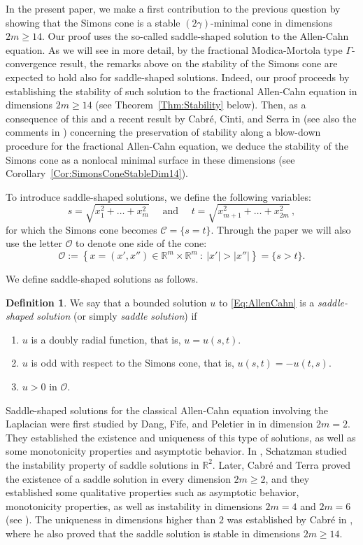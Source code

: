 \documentclass[12pt,reqno]{amsart}
\theoremstyle{definition}
\newtheorem{definition}[theorem]{Definition}
\theoremstyle{remark}
\newcommand{\con}[1]{\mathbb{#1}}
\newcommand{\R}{\con{R}} %
\newcommand{\ocal}{\mathcal{O}}
\newcommand{\s}{\gamma}
\newcommand{\setcond}[2]{\left \{ #1 \ : \ #2  \right \}}
\numberwithin{equation}{section}
\begin{document}
In the present paper, we make a first contribution to the previous question by showing that the Simons cone is a stable $(2\s)$-minimal cone in dimensions $2m\geq 14$. Our proof uses the so-called saddle-shaped solution to the Allen-Cahn equation. As we will see in more detail, by the fractional Modica-Mortola type $\Gamma$-convergence result, the remarks above on the stability of the Simons cone are expected to hold also for saddle-shaped solutions. Indeed, our proof proceeds by establishing the stability of such solution to the fractional Allen-Cahn equation in dimensions $2m \geq 14$ (see Theorem~\ref{Thm:Stability} below). Then, as a consequence of this and a recent result by Cabré, Cinti, and Serra in \cite{CabreCintiSerra-Stable} (see also the comments in \cite{CabreCintiSerra-Cones}) concerning the preservation of stability along a blow-down procedure for the fractional Allen-Cahn equation, we deduce the stability of the Simons cone as a nonlocal minimal surface in these dimensions (see Corollary~\ref{Cor:SimonsConeStableDim14}). 

To introduce saddle-shaped solutions, we define the following variables:
$$
s = \sqrt{x_1^2 + \ldots + x_m^2 } \quad \text{ and } \quad 
t = \sqrt{x_{m+1}^2 + \ldots + x_{2m}^2}\,,
$$
for which the Simons cone becomes $\mathscr{C} = \{s=t\}$.
Through the paper we will also use the letter $\ocal$ to denote one side of the cone:
$$
\ocal:= \setcond{x = (x', x'') \in \R^{m}\times \R^m}{|x'| > |x''|} = \{s > t\}.
$$

We define saddle-shaped solutions as follows.

\begin{definition}
\label{Def:SaddleShapedSol}
We say that a bounded solution $u$ to \eqref{Eq:AllenCahn} is a \emph{saddle-shaped solution} (or simply \emph{saddle solution}) if
\begin{enumerate}[label=(\roman{*})]
\item $u$ is a doubly radial function, that is, $u = u(s,t)$.
\item $u$ is odd with respect to the Simons cone, that is, $u(s,t)=-u(t,s)$.
\item $u > 0$ in $\ocal$.
\end{enumerate}
\end{definition}

Saddle-shaped solutions for the classical Allen-Cahn equation involving the Laplacian were first studied by Dang, Fife, and Peletier in \cite{DangFifePeletier} in dimension $2m=2$. They established the existence and uniqueness of this type of solutions, as well as some monotonicity properties and asymptotic behavior. In \cite{Schatzman}, Schatzman studied the instability property of saddle solutions in $\R^2$. Later, Cabré and Terra  proved the existence of a saddle solution in every dimension $2m\geq 2$, and they established some qualitative properties such as asymptotic behavior, monotonicity properties, as well as instability in dimensions $2m = 4$ and $2m = 6$ (see \cite{CabreTerraI,CabreTerraII}). The uniqueness in dimensions higher than $2$ was established by Cabré in \cite{Cabre-Saddle}, where he also proved that the saddle solution is stable in dimensions $2m \geq 14$.
\end{document}
